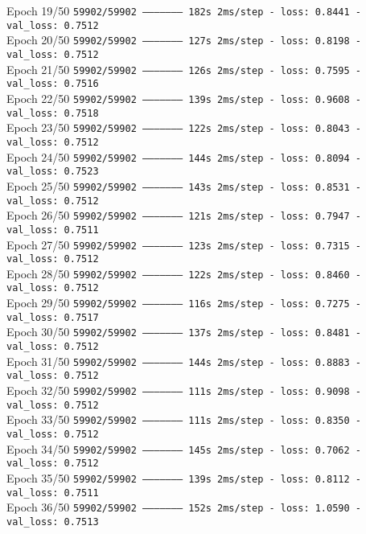 Epoch 19/50
\texttt{59902/59902 -------------------- 182s 2ms/step - loss: 0.8441 - val\_loss: 0.7512}\\
Epoch 20/50
\texttt{59902/59902 -------------------- 127s 2ms/step - loss: 0.8198 - val\_loss: 0.7512}\\
Epoch 21/50
\texttt{59902/59902 -------------------- 126s 2ms/step - loss: 0.7595 - val\_loss: 0.7516}\\
Epoch 22/50
\texttt{59902/59902 -------------------- 139s 2ms/step - loss: 0.9608 - val\_loss: 0.7518}\\
Epoch 23/50
\texttt{59902/59902 -------------------- 122s 2ms/step - loss: 0.8043 - val\_loss: 0.7512}\\
Epoch 24/50
\texttt{59902/59902 -------------------- 144s 2ms/step - loss: 0.8094 - val\_loss: 0.7523}\\
Epoch 25/50
\texttt{59902/59902 -------------------- 143s 2ms/step - loss: 0.8531 - val\_loss: 0.7512}\\
Epoch 26/50
\texttt{59902/59902 -------------------- 121s 2ms/step - loss: 0.7947 - val\_loss: 0.7511}\\
Epoch 27/50
\texttt{59902/59902 -------------------- 123s 2ms/step - loss: 0.7315 - val\_loss: 0.7512}\\
Epoch 28/50
\texttt{59902/59902 -------------------- 122s 2ms/step - loss: 0.8460 - val\_loss: 0.7512}\\
Epoch 29/50
\texttt{59902/59902 -------------------- 116s 2ms/step - loss: 0.7275 - val\_loss: 0.7517}\\
Epoch 30/50
\texttt{59902/59902 -------------------- 137s 2ms/step - loss: 0.8481 - val\_loss: 0.7512}\\
Epoch 31/50
\texttt{59902/59902 -------------------- 144s 2ms/step - loss: 0.8883 - val\_loss: 0.7512}\\
Epoch 32/50
\texttt{59902/59902 -------------------- 111s 2ms/step - loss: 0.9098 - val\_loss: 0.7512}\\
Epoch 33/50
\texttt{59902/59902 -------------------- 111s 2ms/step - loss: 0.8350 - val\_loss: 0.7512}\\
Epoch 34/50
\texttt{59902/59902 -------------------- 145s 2ms/step - loss: 0.7062 - val\_loss: 0.7512}\\
Epoch 35/50
\texttt{59902/59902 -------------------- 139s 2ms/step - loss: 0.8112 - val\_loss: 0.7511}\\
Epoch 36/50
\texttt{59902/59902 -------------------- 152s 2ms/step - loss: 1.0590 - val\_loss: 0.7513}\\
